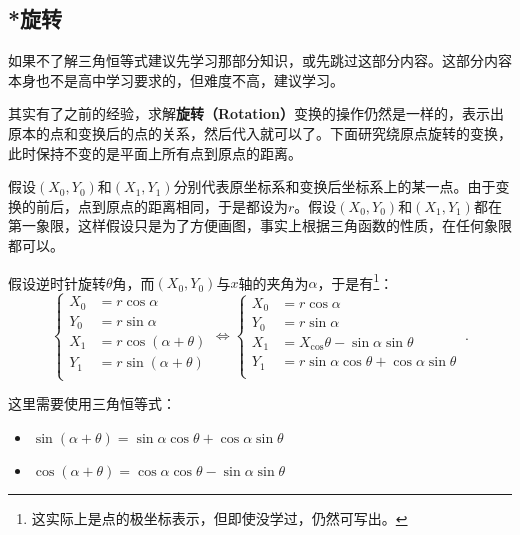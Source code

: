 \subsection{*旋转}


如果不了解三角恒等式建议先学习那部分知识，或先跳过这部分内容。这部分内容本身也不是高中学习要求的，但难度不高，建议学习。

其实有了之前的经验，求解\textbf{旋转（Rotation）}变换的操作仍然是一样的，表示出原本的点和变换后的点的关系，然后代入就可以了。下面研究绕原点旋转的变换，此时保持不变的是平面上所有点到原点的距离。



假设$(X_0,Y_0)$和$(X_1,Y_1)$分别代表原坐标系和变换后坐标系上的某一点。由于变换的前后，点到原点的距离相同，于是都设为$r$。假设$(X_0,Y_0)$和$(X_1,Y_1)$都在第一象限，这样假设只是为了方便画图，事实上根据三角函数的性质，在任何象限都可以。


假设逆时针旋转$\theta$角，而$(X_0,Y_0)$与$x$轴的夹角为$\alpha$，于是有\footnote{这实际上是点的极坐标表示，但即使没学过，仍然可写出。}：
\begin{equation}
\begin{cases}
X_0&=r\cos\alpha\\
Y_0&=r\sin\alpha\\
X_1&=r\cos(\alpha+\theta)\\
Y_1&=r\sin(\alpha+\theta)\\
\end{cases}\iff
\begin{cases}
X_0&=r\cos\alpha\\
Y_0&=r\sin\alpha\\
X_1&=X_ \cos \theta - \sin \alpha \sin \theta\\
Y_1&=r\sin \alpha \cos \theta + \cos \alpha \sin \theta\\
\end{cases}~.
\end{equation}

这里需要使用三角恒等式：
\begin{itemize}
\item $\sin(\alpha + \theta)= \sin \alpha \cos \theta + \cos \alpha \sin \theta$
\item $\cos(\alpha + \theta)=\cos \alpha \cos \theta - \sin \alpha \sin \theta$
\end{itemize}









